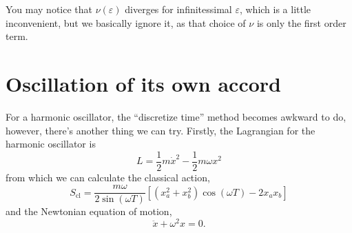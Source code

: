 \documentclass[]{scrreprt}
\begin{document}
You may notice that \( \nu(\varepsilon) \) diverges for infinitessimal \(\varepsilon \), which is a little inconvenient, but we basically ignore it, as that choice of \(\nu\) is only the first order term.

\section{Oscillation of its own accord}
For a harmonic oscillator, the ``discretize time'' method becomes awkward to do, however, there's another thing we can try.
Firstly, the Lagrangian for the harmonic oscillator is
\[ L = \frac{1}{2} m \dot{x}^2 - \frac{1}{2}m \omega x^2\] from which we can calculate the classical action,
\[ S_{\mathrm{cl}} = \frac{m\omega}{2\sin(\omega T)} [(x_a^2 + x_b^2)\cos(\omega T) - 2x_a x_b]\]
and the Newtonian equation of motion, \[ \ddot{x} + \omega^2 x = 0. \]
\end{document}
